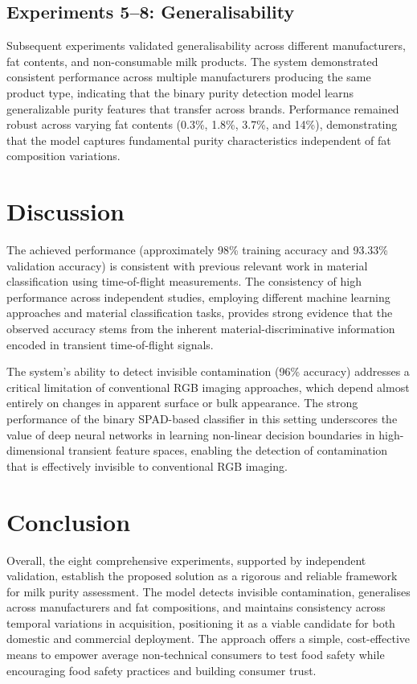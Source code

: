 \documentclass[11pt]{article}
\begin{document}
\subsection{Experiments 5--8: Generalisability}

Subsequent experiments validated generalisability across different manufacturers, fat contents, and non-consumable milk products. The system demonstrated consistent performance across multiple manufacturers producing the same product type, indicating that the binary purity detection model learns generalizable purity features that transfer across brands. Performance remained robust across varying fat contents (0.3\%, 1.8\%, 3.7\%, and 14\%), demonstrating that the model captures fundamental purity characteristics independent of fat composition variations.

\section{Discussion}

The achieved performance (approximately 98\% training accuracy and 93.33\% validation accuracy) is consistent with previous relevant work in material classification using time-of-flight measurements. The consistency of high performance across independent studies, employing different machine learning approaches and material classification tasks, provides strong evidence that the observed accuracy stems from the inherent material-discriminative information encoded in transient time-of-flight signals.

The system's ability to detect invisible contamination (96\% accuracy) addresses a critical limitation of conventional RGB imaging approaches, which depend almost entirely on changes in apparent surface or bulk appearance. The strong performance of the binary SPAD-based classifier in this setting underscores the value of deep neural networks in learning non-linear decision boundaries in high-dimensional transient feature spaces, enabling the detection of contamination that is effectively invisible to conventional RGB imaging.

\section{Conclusion}

Overall, the eight comprehensive experiments, supported by independent validation, establish the proposed solution as a rigorous and reliable framework for milk purity assessment. The model detects invisible contamination, generalises across manufacturers and fat compositions, and maintains consistency across temporal variations in acquisition, positioning it as a viable candidate for both domestic and commercial deployment. The approach offers a simple, cost-effective means to empower average non-technical consumers to test food safety while encouraging food safety practices and building consumer trust.



\end{document}

